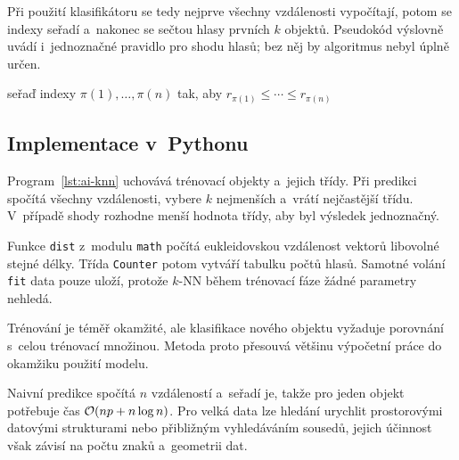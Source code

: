 
Při použití klasifikátoru se tedy nejprve všechny vzdálenosti vypočítají, potom se indexy seřadí a~nakonec se sečtou hlasy prvních \(k\) objektů. Pseudokód výslovně uvádí i~jednoznačné pravidlo pro shodu hlasů; bez něj by algoritmus nebyl úplně určen.

\begin{algorithm}
    \caption{\textsc{k-nn}}
    \label{alg:ai-knn}
    seřaď indexy \(\pi(1),\ldots,\pi(n)\) tak, aby \(r_{\pi(1)}\leqslant\cdots\leqslant r_{\pi(n)}\)\\
\end{algorithm}

\subsection{Implementace v~Pythonu}

Program~\ref{lst:ai-knn} uchovává trénovací objekty a~jejich třídy. Při predikci spočítá všechny vzdálenosti, vybere \(k\) nejmenších a~vrátí nejčastější třídu. V~případě shody rozhodne menší hodnota třídy, aby byl výsledek jednoznačný.

Funkce \texttt{dist} z~modulu \texttt{math} počítá eukleidovskou vzdálenost vektorů libovolné stejné délky. Třída \texttt{Counter} potom vytváří tabulku počtů hlasů. Samotné volání \texttt{fit} data pouze uloží, protože \(k\)-NN během trénovací fáze žádné parametry nehledá.



Trénování je téměř okamžité, ale klasifikace nového objektu vyžaduje porovnání s~celou trénovací množinou. Metoda proto přesouvá většinu výpočetní práce do okamžiku použití modelu.

Naivní predikce spočítá \(n\) vzdáleností a~seřadí je, takže pro jeden objekt potřebuje čas \(\mathcal{O}(np+n\log n)\). Pro velká data lze hledání urychlit prostorovými datovými strukturami nebo přibližným vyhledáváním sousedů, jejich účinnost však závisí na počtu znaků a~geometrii dat.
